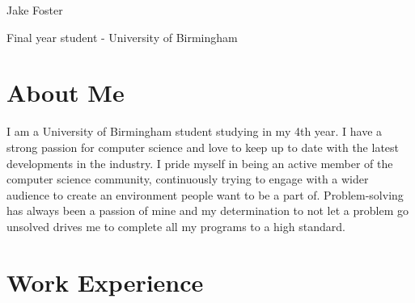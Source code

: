 \documentclass[11pt]{article} %
\begin{document}
\begin{paracol}{2} %


\parbox[top][0.12\textheight][c]{\linewidth}{ %
	\vspace{-0.03\textheight} %
	\centering %
	{\sffamily\HUGE Jake Foster}\\\medskip %
	{\color{headings}\scshape\Large\raggedright Final year student - University of Birmingham}
}


\section{About Me}

I am a University of Birmingham student studying in my 4th year.
I have a strong passion for computer science and love to keep up to date with the latest developments in the industry.
I pride myself in being an active member of the computer science community, continuously trying to engage with a wider audience to create an environment people want to be a part of.
Problem-solving has always been a passion of mine and my determination to not let a problem go unsolved drives me to
complete all my programs to a high standard.

\medskip %


\section{Work Experience}



\end{paracol}
\end{document}
